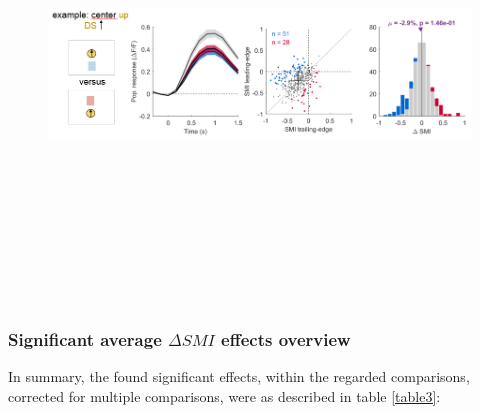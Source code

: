 \begin{figure}[H] \centering \includegraphics[width=12cm,height=12cm,keepaspectratio]{Figures/7.Results/finalPopulation/sel/diagrams/24.png} 
\end{figure}

\subsubsection{Significant average $\Delta SMI$ effects overview}

In summary, the found significant effects, within the regarded comparisons, corrected for multiple comparisons, were as described in table \ref{table3}:

